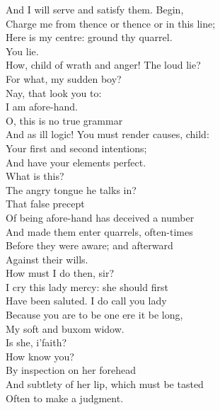 \documentclass[a4paper,oneside,12pt]{memoir}
\begin{document}
\begin{drama*}
And I will serve and satisfy them. Begin,\\
Charge me from thence or thence or in this line;\\
Here is my centre: ground thy quarrel.\\
\kastrilspeaks {} You lie.\\
\subtlespeaks How, child of wrath and anger! The loud lie?\\
For what, my sudden boy?\\
\kastrilspeaks {} Nay, that look you to:\\
I am afore-hand.\\
\subtlespeaks {} O, this is no true grammar\\
And as ill logic! You must render causes, child:\\
Your first and second intentions;\\
And have your elements perfect.\\
\kastrilspeaks {} What is this?\\
The angry tongue he talks in?\\
\subtlespeaks {} That false precept\\
Of being afore-hand has deceived a number\\
And made them enter quarrels, often-times\\
Before they were aware; and afterward\\
Against their wills.\\
\kastrilspeaks {} How must I do then, sir?\\
\subtlespeaks I cry this lady mercy: she should first\\
Have been saluted. I do call you lady\\
Because you are to be one ere it be long,\\
My soft and buxom widow.\\
\kastrilspeaks {} Is she, i'faith?\\
How know you?\\
\subtlespeaks {} By inspection on her forehead\\
And subtlety of her lip, which must be tasted\\
Often to make a judgment.\\

\end{drama*}
\end{document}
